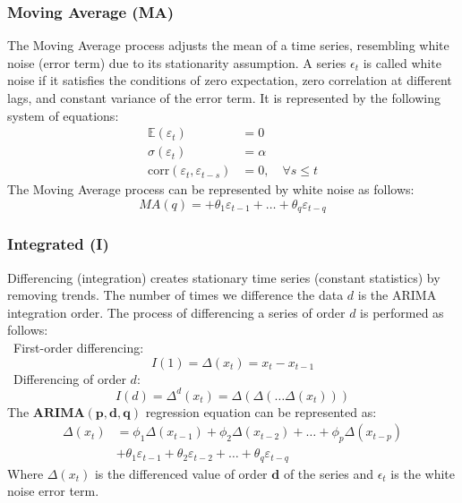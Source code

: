 \documentclass{ieeeojies}
\begin{document}
\subsubsection{Moving Average (MA)}
The Moving Average process adjusts the mean of a time series, resembling white noise (error term) due to its stationarity assumption\cite{b9}. A series \(\epsilon_t\) is called white noise if it satisfies the conditions of zero expectation, zero correlation at different lags, and constant variance of the error term\cite{b10}. It is represented by the following system of equations:
\begin{align*}
\mathbb{E}(\varepsilon_t) &= 0 \\
\sigma(\varepsilon_t) &= \alpha\\
\text{corr}(\varepsilon_t, \varepsilon_{t-s}) &= 0, \quad \forall s \leq t
\end{align*}
The Moving Average process can be represented by white noise as follows:
$$MA(q) =  + \theta_1 \varepsilon_{t-1} + \dots + \theta_q\varepsilon_{t-q}$$
\subsubsection{Integrated (I)}
Differencing (integration) creates stationary time series (constant statistics) by removing trends. The number of times we difference the data \(d\) is the ARIMA integration order\cite{b10}. The process of differencing a series of order \(d\) is performed as follows:\\
	\indent\textbullet\ First-order differencing: 
        $$I(1) = \Delta(x_t) = x_t -x_{t-1}$$
        \indent\textbullet\ Differencing of order \(d\):
        $$I(d) = \Delta^d(x_t) = \Delta(\Delta(\dots\Delta(x_t)))$$
The \(\mathbf {ARIMA(p,d,q)}\) regression equation can be represented as:
\begin{equation}
\begin{split}
\Delta(x_t) &= \phi_1\Delta(x_{t-1}) + \phi_2\Delta(x_{t-2}) + \dots + \phi_p\Delta(x_{t-p}) \\
&+ \theta_1 \varepsilon_{t-1} + \theta_2 \varepsilon_{t-2} + \dots + \theta_q\varepsilon_{t-q}
\end{split}
\end{equation}
Where \(\Delta(x_t)\) is the differenced value of order \(\mathbf d\) of the series and \(\epsilon_t\) is the white noise error term.
\end{document}
